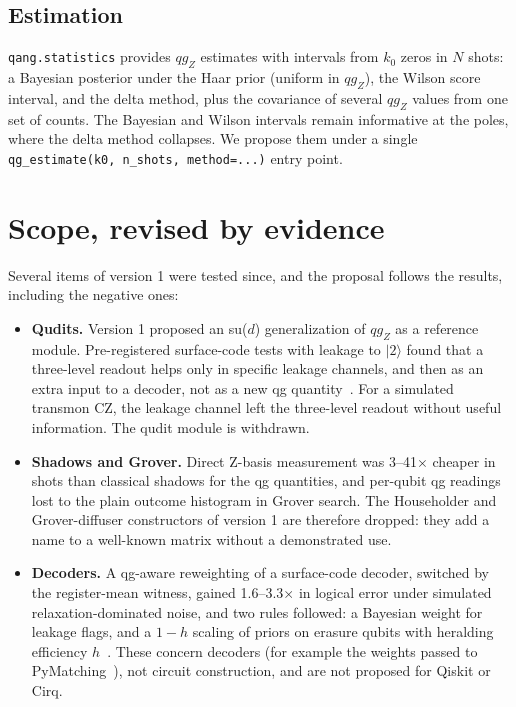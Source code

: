 \documentclass[11pt]{article}
\newcommand{\qgZ}{qg_Z}
\begin{document}
\subsection{Estimation}

\texttt{qang.statistics} provides $\qgZ$ estimates with intervals from $k_0$ zeros in $N$ shots: a Bayesian
posterior under the Haar prior (uniform in $\qgZ$), the Wilson score interval, and the delta method,
plus the covariance of several $\qgZ$ values from one set of counts. The Bayesian and Wilson intervals
remain informative at the poles, where the delta method collapses. We propose them under a single
\texttt{qg\_estimate(k0, n\_shots, method=...)} entry point.

\section{Scope, revised by evidence}\label{sec:scope}

Several items of version 1 were tested since, and the proposal follows the results, including the
negative ones:

\begin{itemize}
\item \textbf{Qudits.} Version 1 proposed an su($d$) generalization of $\qgZ$ as a reference module.
Pre-registered surface-code tests with leakage to $|2\rangle$ found that a three-level readout helps only
in specific leakage channels, and then as an extra input to a decoder, not as a new qg
quantity~\cite{monteverde2026leakage}. For a simulated transmon CZ, the leakage channel left the
three-level readout without useful information. The qudit module is withdrawn.
\item \textbf{Shadows and Grover.} Direct Z-basis measurement was 3--41$\times$ cheaper in shots than
classical shadows for the qg quantities, and per-qubit qg readings lost to the plain outcome histogram
in Grover search. The Householder and Grover-diffuser constructors of version 1 are therefore dropped:
they add a name to a well-known matrix without a demonstrated use.
\item \textbf{Decoders.} A qg-aware reweighting of a surface-code decoder, switched by the register-mean
witness, gained 1.6--3.3$\times$ in logical error under simulated relaxation-dominated noise, and two rules followed: a
Bayesian weight for leakage flags, and a $1-h$ scaling of priors on erasure qubits with heralding
efficiency $h$~\cite{monteverde2026witness,monteverde2026leakage}. These concern decoders (for example
the weights passed to PyMatching~\cite{higgott2022pymatching}), not circuit construction, and are not
proposed for Qiskit or Cirq.
\end{itemize}
\end{document}
